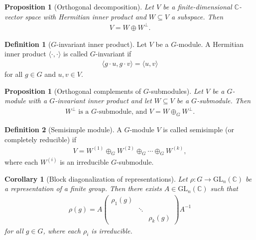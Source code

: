 \documentclass[titlepage]{article}
\theoremstyle{plain}
\newtheorem{proposition}[theorem]{Proposition}
\newtheorem{corollary}[theorem]{Corollary}
\theoremstyle{definition}
\newtheorem{definition}{Definition}[section]
\theoremstyle{remark}
\theoremstyle{exercise-style}
\numberwithin{equation}{section}
\numberwithin{theorem}{section}
\numberwithin{remark}{section}
\begin{document}
\begin{proposition}[Orthogonal decomposition]
Let $V$ be a finite-dimensional $\mathbb{C}$-vector space with Hermitian inner product and $W \subseteq V$ a subspace. Then
\begin{align}
V = W \oplus W^\perp.
\end{align}
\end{proposition}

\begin{definition}[$G$-invariant inner product]
Let $V$ be a $G$-module. A Hermitian inner product $\langle \cdot, \cdot \rangle$ is called $G$-invariant if
\begin{align}
\langle g \cdot u, g \cdot v \rangle = \langle u, v \rangle
\end{align}
for all $g \in G$ and $u,v \in V$.
\end{definition}

\begin{proposition}[Orthogonal complements of $G$-submodules]
Let $V$ be a $G$-module with a $G$-invariant inner product and let $W \subseteq V$ be a $G$-submodule. Then
\begin{align}
W^\perp \text{ is a $G$-submodule, and } V = W \oplus_G W^\perp.
\end{align}
\end{proposition}

\begin{definition}[Semisimple module]
A $G$-module $V$ is called semisimple (or completely reducible) if
\begin{align}
V = W^{(1)} \oplus_G W^{(2)} \oplus_G \cdots \oplus_G W^{(k)},
\end{align}
where each $W^{(i)}$ is an irreducible $G$-submodule.
\end{definition}

\begin{corollary}[Block diagonalization of representations]
Let $\rho: G \to \mathrm{GL}_n(\mathbb{C})$ be a representation of a finite group. Then there exists $A \in \mathrm{GL}_n(\mathbb{C})$ such that
\begin{align}
\rho(g) = A
\begin{pmatrix}
\rho_1(g) & & \\
& \ddots & \\
& & \rho_k(g)
\end{pmatrix}
A^{-1}
\end{align}
for all $g \in G$, where each $\rho_i$ is irreducible.
\end{corollary}
\end{document}
